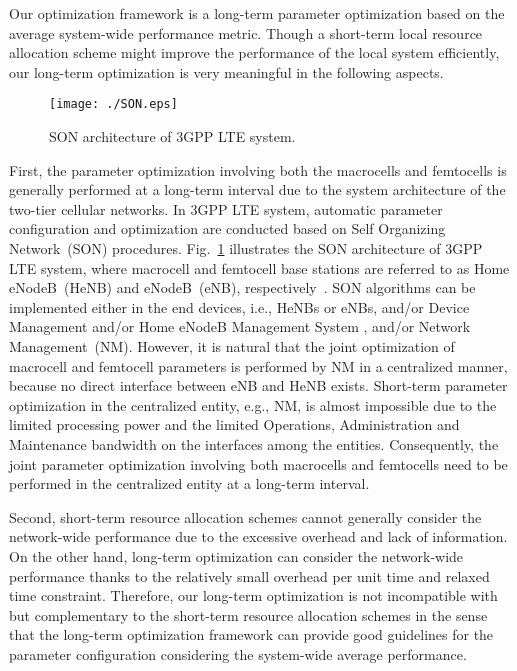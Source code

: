 \documentclass[journal]{IEEEtran}
\begin{document}
Our optimization framework is a long-term parameter optimization
based on the average system-wide performance metric.
Though a short-term local resource allocation scheme might
improve the performance of the local system efficiently,
our long-term optimization is very meaningful
in the following aspects.

\begin{figure}
\begin{center}
\texttt{[image: ./SON.eps]}
\caption{SON architecture of 3GPP LTE system.}
\label{fig:son}
\end{center}
\end{figure}
First, the parameter optimization involving both the
macrocells and femtocells is generally performed
at a long-term interval due to the system
architecture of the two-tier cellular networks.
In 3GPP LTE system, automatic parameter configuration and optimization
are conducted based on Self Organizing Network~(SON) procedures.
Fig.~\ref{fig:son} illustrates the
SON architecture of 3GPP LTE system,
where macrocell and femtocell base stations
are referred to as Home eNodeB~(HeNB) and eNodeB~(eNB), respectively~\cite{book12Hamalainen}.
SON algorithms can be implemented either
in the end devices, i.e., HeNBs or eNBs, and/or Device Management
and/or Home eNodeB Management System
, and/or Network Management~(NM). However, it is natural that the joint optimization of
macrocell and femtocell parameters is performed by NM in a centralized manner,
because no direct interface between eNB and HeNB exists.
Short-term parameter optimization in the centralized entity, e.g., NM,
is almost impossible due to the limited processing power and
the limited Operations, Administration and Maintenance
bandwidth on the interfaces among the entities.
Consequently, the joint parameter optimization involving both
macrocells and femtocells need to be performed
in the centralized entity at a long-term interval.

Second, short-term resource allocation schemes cannot generally
consider the network-wide performance
due to the excessive overhead and lack of information.
On the other hand, long-term optimization can consider
the network-wide performance thanks to the relatively small overhead
per unit time and relaxed time constraint.
Therefore, our long-term optimization is not
incompatible with but complementary to the short-term
resource allocation schemes
in the sense that the long-term optimization framework can provide good guidelines
for the parameter configuration considering the system-wide average
performance.
\end{document}
